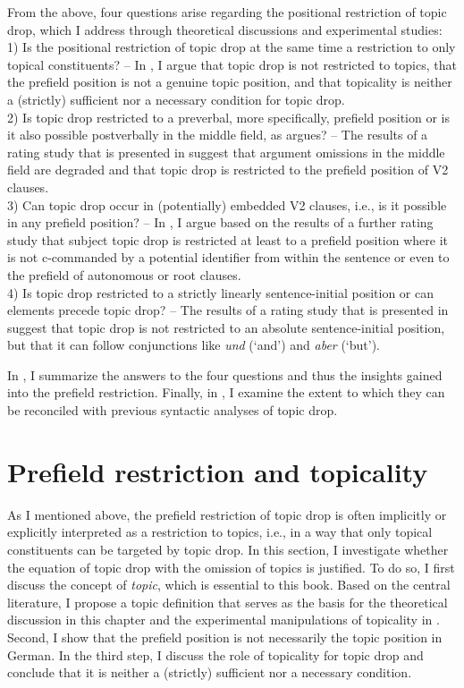 From the above, four questions arise regarding the positional restriction of topic drop, which I address through theoretical discussions and experimental studies: \\
1) Is the positional restriction of topic drop at the same time a restriction to only topical constituents? -- In , I argue that topic drop is not restricted to topics, that the prefield position is not a genuine topic position, and that topicality is neither a (strictly) sufficient nor a necessary condition for topic drop.\\
2) Is topic drop restricted to a preverbal, more specifically, prefield position or is it also possible postverbally in the middle field, as \citet{helmer2016} argues? -- The results of a rating study that is presented in  suggest that argument omissions in the middle field are degraded and that topic drop is restricted to the prefield position of V2 clauses. \\
3) Can topic drop occur in (potentially) embedded V2 clauses, i.e., is it possible in any prefield position? -- In , I argue based on the results of a further rating study that subject topic drop is restricted at least to a prefield position where it is not c-commanded by a potential identifier from within the sentence or even to the prefield of autonomous or root clauses.\\
4) Is topic drop restricted to a strictly linearly sentence-initial position or can elements precede topic drop? -- The results of a rating study that is presented in  suggest that topic drop is not restricted to an absolute sentence-initial position, but that it can follow conjunctions  like \textit{und} (`and') and \textit{aber} (`but').

In , I summarize the answers to the four questions and thus the insights gained into the prefield restriction.
Finally, in , I examine the extent to which they can be reconciled with previous syntactic analyses of topic drop.

\section{Prefield restriction and topicality}\label{sec:topicality}
As I mentioned above, the prefield restriction of topic drop is often implicitly or explicitly interpreted as a restriction to topics, i.e., in a way that only topical constituents can be targeted by topic drop.
In this section, I investigate whether the equation of topic drop with the omission of topics is justified.
To do so, I first discuss the concept of \textit{topic}, which is essential to this book.
Based on the central literature, I propose a topic definition that serves as the basis for the theoretical discussion in this chapter and the experimental manipulations of topicality in .
Second, I show that the prefield position is not necessarily the topic position in German.
In the third step, I discuss the role of topicality for topic drop and conclude that it is neither a (strictly) sufficient nor a necessary condition.

